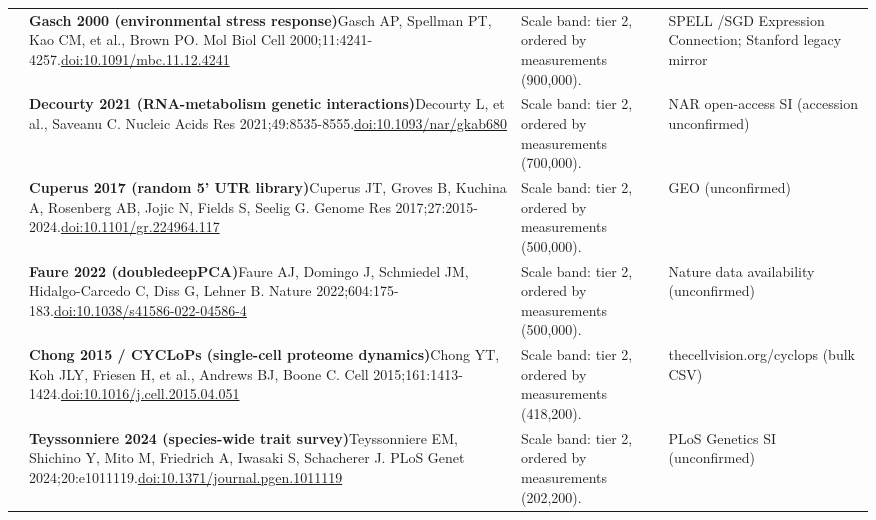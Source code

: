 \begin{landscape}
\begin{longtable}{@{}r@{\hspace{4pt}} L{86mm} L{92mm} L{62mm}@{}}
 & \textbf{Gasch 2000 (environmental stress response)}\newline Gasch AP, Spellman PT, Kao CM, et al., Brown PO. Mol Biol Cell 2000;11:4241-4257.\newline \href{https://doi.org/10.1091/mbc.11.12.4241}{doi:10.1091/\allowbreak mbc.11.12.4241} & Scale band: tier 2, ordered by measurements (900,000). & SPELL /\allowbreak  SGD Expression Connection; Stanford legacy mirror \\
 & \textbf{Decourty 2021 (RNA-metabolism genetic interactions)}\newline Decourty L, et al., Saveanu C. Nucleic Acids Res 2021;49:8535-8555.\newline \href{https://doi.org/10.1093/nar/gkab680}{doi:10.1093/\allowbreak nar/\allowbreak gkab680} & Scale band: tier 2, ordered by measurements (700,000). & NAR open-access SI (accession unconfirmed) \\
 & \textbf{Cuperus 2017 (random 5' UTR library)}\newline Cuperus JT, Groves B, Kuchina A, Rosenberg AB, Jojic N, Fields S, Seelig G. Genome Res 2017;27:2015-2024.\newline \href{https://doi.org/10.1101/gr.224964.117}{doi:10.1101/\allowbreak gr.224964.117} & Scale band: tier 2, ordered by measurements (500,000). & GEO (unconfirmed) \\
 & \textbf{Faure 2022 (doubledeepPCA)}\newline Faure AJ, Domingo J, Schmiedel JM, Hidalgo-Carcedo C, Diss G, Lehner B. Nature 2022;604:175-183.\newline \href{https://doi.org/10.1038/s41586-022-04586-4}{doi:10.1038/\allowbreak s41586-022-04586-4} & Scale band: tier 2, ordered by measurements (500,000). & Nature data availability (unconfirmed) \\
 & \textbf{Chong 2015 / CYCLoPs (single-cell proteome dynamics)}\newline Chong YT, Koh JLY, Friesen H, et al., Andrews BJ, Boone C. Cell 2015;161:1413-1424.\newline \href{https://doi.org/10.1016/j.cell.2015.04.051}{doi:10.1016/\allowbreak j.cell.2015.04.051} & Scale band: tier 2, ordered by measurements (418,200). & thecellvision.org/\allowbreak cyclops (bulk CSV) \\
 & \textbf{Teyssonniere 2024 (species-wide trait survey)}\newline Teyssonniere EM, Shichino Y, Mito M, Friedrich A, Iwasaki S, Schacherer J. PLoS Genet 2024;20:e1011119.\newline \href{https://doi.org/10.1371/journal.pgen.1011119}{doi:10.1371/\allowbreak journal.pgen.1011119} & Scale band: tier 2, ordered by measurements (202,200). & PLoS Genetics SI (unconfirmed) \\

\end{longtable}
\end{landscape}

